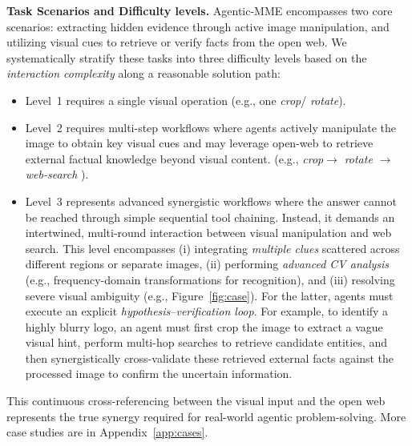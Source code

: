 \documentclass[runningheads]{llncs}
\theoremstyle{plain}
\theoremstyle{definition}
\theoremstyle{remark}
\begin{document}
\vspace{1mm}
\noindent\textbf{Task Scenarios and Difficulty levels.}
Agentic-MME encompasses two core scenarios: extracting hidden evidence through active image manipulation, and utilizing visual cues to retrieve or verify facts from the open web. We systematically stratify these tasks into three difficulty levels based on the \emph{interaction complexity} along a reasonable solution path: 
\begin{itemize}[leftmargin=*,itemsep=-0.1em,topsep=0.1em]
  \renewcommand\labelitemi{$\diamond$}  
  \item Level~1 requires a single visual operation (e.g., one \textit{crop}/ \textit{rotate}). 
  \item Level~2 requires multi-step workflows where agents actively manipulate the image to obtain key visual cues and may leverage open-web to retrieve external factual knowledge beyond visual content. (e.g., \textit{crop}$\rightarrow$ \textit{rotate} $\rightarrow$ \textit{ web-search} ). \item Level~3 represents advanced synergistic workflows where the answer cannot be reached through simple sequential tool chaining. Instead, it demands an intertwined, multi-round interaction between visual manipulation and web search. This level encompasses (i) integrating \emph{multiple clues} scattered across different regions or separate images, (ii) performing \emph{advanced CV analysis} (e.g., frequency-domain transformations for recognition), and (iii) resolving severe visual ambiguity (e.g., Figure~\ref{fig:case}). For the latter, agents must execute an explicit \textit{hypothesis--verification loop}. For example, to identify a highly blurry logo, an agent must first crop the image to extract a vague visual hint, perform multi-hop searches to retrieve candidate entities, and then synergistically cross-validate these retrieved external facts against the processed image to confirm the uncertain information.\end{itemize} This continuous cross-referencing between the visual input and the open web represents the true synergy required for real-world agentic problem-solving. More case studies are in Appendix~\ref{app:cases}.
\end{document}
